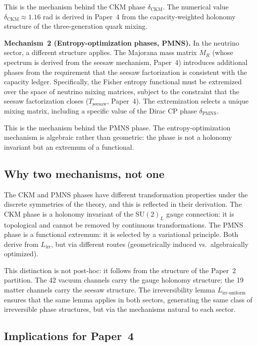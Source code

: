 \documentclass[11pt]{article}
\newcommand{\SU}{\mathrm{SU}}
\begin{document}
This is the mechanism behind the CKM phase $\delta_{\mathrm{CKM}}$.  The
numerical value $\delta_{\mathrm{CKM}} \approx 1.16$ rad is derived in
Paper~4 from the capacity-weighted holonomy structure of the three-generation
quark mixing.

\textbf{Mechanism~2 (Entropy-optimization phases, PMNS).}  In the neutrino
sector, a different structure applies.  The Majorana mass matrix $M_R$ (whose
spectrum is derived from the seesaw mechanism, Paper~4) introduces additional
phases from the requirement that the seesaw factorization is consistent with
the capacity ledger.  Specifically, the Fisher entropy functional must be
extremized over the space of neutrino mixing matrices, subject to the
constraint that the seesaw factorization closes ($T_{\mathrm{seesaw}}$,
Paper~4).  The extremization selects a unique mixing matrix, including a
specific value of the Dirac CP phase $\delta_{\mathrm{PMNS}}$.

This is the mechanism behind the PMNS phase.  The entropy-optimization
mechanism is algebraic rather than geometric: the phase is not a holonomy
invariant but an extremum of a functional.

\subsection{Why two mechanisms, not one}

The CKM and PMNS phases have different transformation properties under the
discrete symmetries of the theory, and this is reflected in their derivation.
The CKM phase is a holonomy invariant of the $\SU(2)_L$ gauge connection: it
is topological and cannot be removed by continuous transformations.  The PMNS
phase is a functional extremum: it is selected by a variational principle.
Both derive from $L_{\mathrm{irr}}$, but via different routes (geometrically
induced vs.\ algebraically optimized).

This distinction is not post-hoc: it follows from the structure of the
Paper~2 partition.  The 42 vacuum channels carry the gauge holonomy
structure; the 19 matter channels carry the seesaw structure.  The
irreversibility lemma $L_{\mathrm{irr\text{-}uniform}}$ ensures that the
same lemma applies in both sectors, generating the same class of irreversible
phase structures, but via the mechanisms natural to each sector.

\subsection{Implications for Paper~4}
\end{document}
